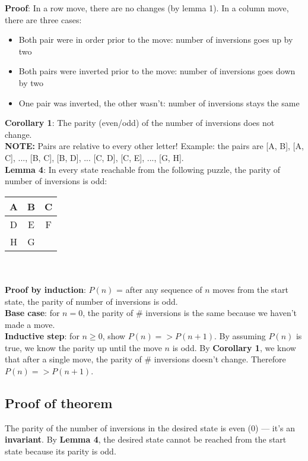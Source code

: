 \documentclass{article}
\begin{document}
	\textbf{Proof}: In a row move, there are no changes (by lemma 1). In a column move, there are three cases:
	\begin{itemize}
		\item Both pair were in order prior to the move: number of inversions goes up by two
		\item Both pairs were inverted prior to the move: number of inversions goes down by two
		\item One pair was inverted, the other wasn't: number of inversions stays the same
	\end{itemize}
	\textbf{Corollary 1}: The parity (even/odd) of the number of inversions does not change.\\
	\textbf{NOTE:} Pairs are relative to every other letter! Example: the pairs are [A, B], [A, C], ..., [B, C], [B, D], ... [C, D], [C, E], ..., [G, H].
	\\
	
	\textbf{Lemma 4}: In every state reachable from the following puzzle, the parity of number of inversions is odd:
	\\
	
	\begin{tabular}{ |c|c|c| } 
		\hline
		A & B & C \\
		\hline
		D & E & F \\ 
		\hline
		H & G & \\ 
		\hline
	\end{tabular}
	\\
	\\
	
	\textbf{Proof by induction}: $P(n)$ = after any sequence of $n$ moves from the start state, the parity of number of inversions is odd.
	\\
	
	\textbf{Base case}:  for $n = 0$, the parity of \# inversions is the same because we haven't made a move.
	\\
	
	\textbf{Inductive step}: for $n \geq 0$, show $P(n) => P(n + 1)$. By assuming $P(n)$ is true, we know the parity up until the move $n$ is odd. By \textbf{Corollary 1}, we know that after a single move, the parity of \# inversions doesn't change. Therefore $P(n) => P(n + 1)$.
	\\
	\subsection{Proof of theorem}
	The parity of the number of inversions in the desired state is even ($0$) --- it's an \textbf{invariant}. By \textbf{Lemma 4}, the desired state cannot be reached from the start state because its parity is odd.
	
\end{document}
